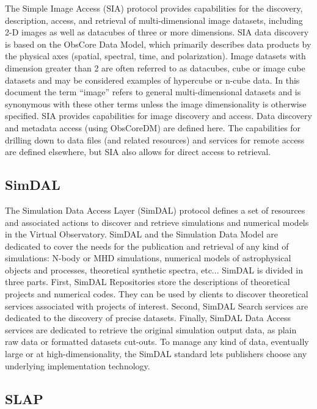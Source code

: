 \documentclass[11pt,a4paper]{ivoa}
\begin{document}
The Simple Image Access (SIA) \citep{2015ivoa.spec.1223D} protocol provides capabilities for the discovery, description, 
access, and retrieval of multi-dimensional image datasets, including 2-D images as well 
as datacubes of three or more dimensions. SIA data discovery is based on the ObsCore Data 
Model, which primarily describes data products by the physical axes (spatial, spectral, 
time, and polarization). Image datasets with dimension greater than 2 are often referred 
to as datacubes, cube or image cube datasets and may be considered examples of hypercube 
or n-cube data. In this document the term ``image'' refers to general multi-dimensional 
datasets and is synonymous with these other terms unless the image dimensionality is 
otherwise specified. SIA provides capabilities for image discovery and access. Data 
discovery and metadata access (using ObsCoreDM) are defined here. The capabilities for 
drilling down to data files (and related resources) and services for remote access are 
defined elsewhere, but SIA also allows for direct access to retrieval. 

\subsection{SimDAL}

The Simulation Data Access Layer (SimDAL) \citep{2017ivoa.spec.0320L} protocol defines a set of resources and associated 
actions to discover and retrieve simulations and numerical models in the Virtual Observatory. 
SimDAL and the Simulation Data Model are dedicated to cover the needs for the publication 
and retrieval of any kind of simulations: N-body or MHD simulations, numerical models of 
astrophysical objects and processes, theoretical synthetic spectra, etc... SimDAL is 
divided in three parts. First, SimDAL Repositories store the descriptions of theoretical 
projects and numerical codes. They can be used by clients to discover theoretical 
services associated with projects of interest. Second, SimDAL Search services are 
dedicated to the discovery of precise datasets. Finally, SimDAL Data Access services 
are dedicated to retrieve the original simulation output data, as plain raw data or 
formatted datasets cut-outs. To manage any kind of data, eventually large or at 
high-dimensionality, the SimDAL standard lets publishers choose any underlying 
implementation technology. 

\subsection{SLAP}
\end{document}
